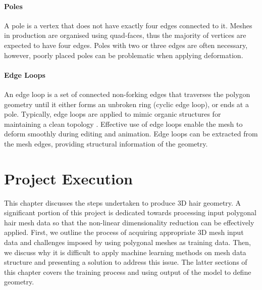 \documentclass[ %
author={Dillon Keith Diep},
supervisor={Dr. Carl Henrik Ek},
degree={MEng},
title={ART-CG:},
subtitle={Assisted Real-time Content Generation of 3D Hair by Learning Manifolds},
type={Research},
year={2017} ]{dissertation}
\begin{document}
\subsubsection{Poles}
A pole is a vertex that does not have exactly four edges connected to it\cite[p.92]{blenderstudio}. Meshes in production are organised using quad-faces, thus the majority of vertices are expected to have four edges. Poles with two or three edges are often necessary, however, poorly placed poles can be problematic when applying deformation.

\subsubsection{Edge Loops}
An edge loop is a set of connected non-forking edges that traverses the polygon geometry until it either forms an unbroken ring (cyclic edge loop), or ends at a pole\cite[p.93]{blenderstudio}. Typically, edge loops are applied to mimic organic structures for maintaining a clean topology \cite[pp.10-12]{edgeloops}. Effective use of edge loops enable the mesh to deform smoothly during editing and animation. Edge loops can be extracted from the mesh edges, providing structural information of the geometry.



\chapter{Project Execution}
\label{chap:execution}

This chapter discusses the steps undertaken to produce 3D hair geometry. A significant portion of this project is dedicated towards processing input polygonal hair mesh data so that the non-linear dimensionality reduction can be effectively applied. First, we outline the process of acquiring appropriate 3D mesh input data and challenges imposed by using polygonal meshes as training data. Then, we discuss why it is difficult to apply machine learning methods on mesh data structure and presenting a solution to address this issue. The latter sections of this chapter covers the training process and using output of the model to define geometry.
\end{document}
